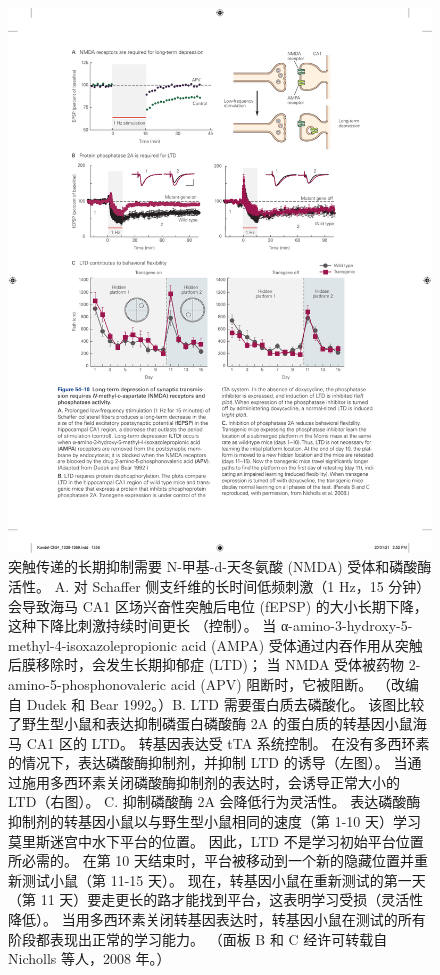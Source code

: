 \begin{figure}[htbp]
	\centering
	\includegraphics[width=0.95\linewidth]{chap54/fig_54_10}
	\caption{突触传递的长期抑制需要 N-甲基-d-天冬氨酸 (NMDA) 受体和磷酸酶活性。 A. 对 Schaffer 侧支纤维的长时间低频刺激（1 Hz，15 分钟）会导致海马 CA1 区场兴奋性突触后电位 (fEPSP) 的大小长期下降，这种下降比刺激持续时间更长 （控制）。 当 α-amino-3-hydroxy-5-methyl-4-isoxazolepropionic acid (AMPA) 受体通过内吞作用从突触后膜移除时，会发生长期抑郁症 (LTD)； 当 NMDA 受体被药物 2-amino-5-phosphonovaleric acid (APV) 阻断时，它被阻断。 （改编自 Dudek 和 Bear 1992。）B. LTD 需要蛋白质去磷酸化。 该图比较了野生型小鼠和表达抑制磷蛋白磷酸酶 2A 的蛋白质的转基因小鼠海马 CA1 区的 LTD。 转基因表达受 tTA 系统控制。 在没有多西环素的情况下，表达磷酸酶抑制剂，并抑制 LTD 的诱导（左图）。 当通过施用多西环素关闭磷酸酶抑制剂的表达时，会诱导正常大小的 LTD（右图）。 C. 抑制磷酸酶 2A 会降低行为灵活性。 表达磷酸酶抑制剂的转基因小鼠以与野生型小鼠相同的速度（第 1-10 天）学习莫里斯迷宫中水下平台的位置。 因此，LTD 不是学习初始平台位置所必需的。 在第 10 天结束时，平台被移动到一个新的隐藏位置并重新测试小鼠（第 11-15 天）。 现在，转基因小鼠在重新测试的第一天（第 11 天）要走更长的路才能找到平台，这表明学习受损（灵活性降低）。 当用多西环素关闭转基因表达时，转基因小鼠在测试的所有阶段都表现出正常的学习能力。 （面板 B 和 C 经许可转载自 Nicholls 等人，2008 年。）}
	\label{fig:54_10}
\end{figure}


